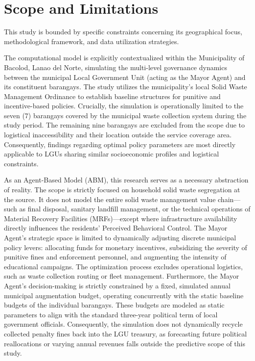 \section{Scope and Limitations}
\setlength{\parindent}{2em}

This study is bounded by specific constraints concerning its geographical focus, methodological framework, and data utilization strategies.

The computational model is explicitly contextualized within the Municipality of Bacolod, Lanao del Norte, simulating the multi-level governance dynamics between the municipal Local Government Unit (acting as the Mayor Agent) and its constituent barangays. The study utilizes the municipality's local Solid Waste Management Ordinance to establish baseline structures for punitive and incentive-based policies. Crucially, the simulation is operationally limited to the seven (7) barangays covered by the municipal waste collection system during the study period. The remaining nine barangays are excluded from the scope due to logistical inaccessibility and their location outside the service coverage area. Consequently, findings regarding optimal policy parameters are most directly applicable to LGUs sharing similar socioeconomic profiles and logistical constraints.

As an Agent-Based Model (ABM), this research serves as a necessary abstraction of reality. The scope is strictly focused on household solid waste segregation at the source. It does not model the entire solid waste management value chain---such as final disposal, sanitary landfill management, or the technical operations of Material Recovery Facilities (MRFs)---except where infrastructure availability directly influences the residents' Perceived Behavioral Control. The Mayor Agent’s strategic space is limited to dynamically adjusting discrete municipal policy levers: allocating funds for monetary incentives, subsidizing the severity of punitive fines and enforcement personnel, and augmenting the intensity of educational campaigns. The optimization process excludes operational logistics, such as waste collection routing or fleet management. Furthermore, the Mayor Agent's decision-making is strictly constrained by a fixed, simulated annual municipal augmentation budget, operating concurrently with the static baseline budgets of the individual barangays. These budgets are modeled as static parameters to align with the standard three-year political term of local government officials. Consequently, the simulation does not dynamically recycle collected penalty fines back into the LGU treasury, as forecasting future political reallocations or varying annual revenues falls outside the predictive scope of this study.

